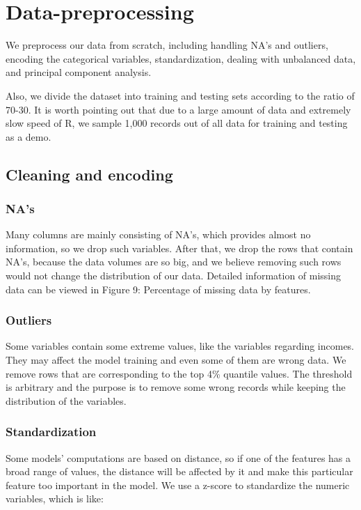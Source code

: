 \documentclass{jpp}
\begin{document}
\section{Data-preprocessing}

We preprocess our data from scratch, including handling NA’s and outliers, encoding the categorical variables, standardization, dealing with unbalanced data, and principal component analysis. 

Also, we divide the dataset into training and testing sets according to the ratio of 70-30. It is worth pointing out that due to a large amount of data and extremely slow speed of R, we sample 1,000 records out of all data for training and testing as a demo. 

\subsection{Cleaning and encoding}

\subsubsection{NA’s}

Many columns are mainly consisting of NA’s, which provides almost no information, so we drop such variables. After that, we drop the rows that contain NA’s, because the data volumes are so big, and we believe removing such rows would not change the distribution of our data. Detailed information of missing data can be viewed in Figure 9: Percentage of missing data by features.

\subsubsection{Outliers}

Some variables contain some extreme values, like the variables regarding incomes. They may affect the model training and even some of them are wrong data. We remove rows that are corresponding to the top 4\% quantile values. The threshold is arbitrary and the purpose is to remove some wrong records while keeping the distribution of the variables.

\subsubsection{Standardization}

Some models’ computations are based on distance, so if one of the features has a broad range of values, the distance will be affected by it and make this particular feature too important in the model. We use a z-score to standardize the numeric variables, which is like: 
\end{document}
